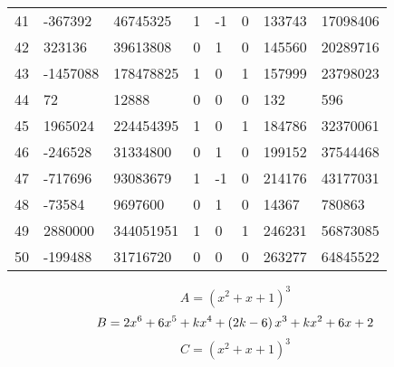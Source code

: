 \documentclass{amsart}
\begin{document}
\begin{longtable}{|l|l|l|lllll|}
41&-367392&46745325&1&-1&0&133743&17098406\\
42&323136&39613808&0&1&0&145560&20289716\\
43&-1457088&178478825&1&0&1&157999&23798023\\
44&72&12888&0&0&0&132&596\\
45&1965024&224454395&1&0&1&184786&32370061\\
46&-246528&31334800&0&1&0&199152&37544468\\
47&-717696&93083679&1&-1&0&214176&43177031\\
48&-73584&9697600&0&1&0&14367&780863\\
49&2880000&344051951&1&0&1&246231&56873085\\
50&-199488&31716720&0&0&0&263277&64845522\\
\hline
\end{longtable}
$$A=(x^2
 + x
 + 1)^{3}$$
$$B=2\*x^6
 + 6\*x^5
 + k\*x^4
 + \left(2\*k
 - 6\right) \*x^3
 + k\*x^2
 + 6\*x
 + 2$$
$$C=(x^2
 + x
 + 1)^{3}$$
\end{document}
